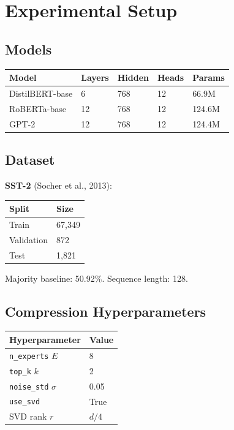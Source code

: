 \section{Experimental Setup}

\subsection{Models}

\begin{table}[H]
\centering
\small
\begin{tabular}{lllll}
\toprule
\textbf{Model} & \textbf{Layers} & \textbf{Hidden} & \textbf{Heads} & \textbf{Params} \\
\midrule
DistilBERT-base & 6 & 768 & 12 & 66.9M \\
RoBERTa-base & 12 & 768 & 12 & 124.6M \\
GPT-2 & 12 & 768 & 12 & 124.4M \\
\bottomrule
\end{tabular}
\end{table}

\subsection{Dataset}

\textbf{SST-2} (Socher et al., 2013):

\begin{table}[H]
\centering
\small
\begin{tabular}{ll}
\toprule
\textbf{Split} & \textbf{Size} \\
\midrule
Train & 67,349 \\
Validation & 872 \\
Test & 1,821 \\
\bottomrule
\end{tabular}
\end{table}

Majority baseline: 50.92\%. Sequence length: 128.

\subsection{Compression Hyperparameters}

\begin{table}[H]
\centering
\small
\begin{tabular}{ll}
\toprule
\textbf{Hyperparameter} & \textbf{Value} \\
\midrule
\texttt{n\_experts} $E$ & 8 \\
\texttt{top\_k} $k$ & 2 \\
\texttt{noise\_std} $\sigma$ & 0.05 \\
\texttt{use\_svd} & True \\
SVD rank $r$ & $d/4$ \\
\bottomrule
\end{tabular}
\end{table}

